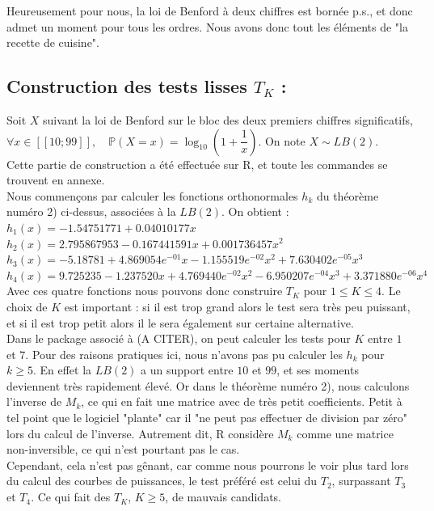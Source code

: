 \documentclass[12pt,a4paper]{article}
\begin{document}
Heureusement pour nous, la loi de Benford à deux chiffres est bornée p.s., et donc admet un moment pour tous les ordres. Nous avons donc tout les éléments de "la recette de cuisine".


\subsection{Construction des tests lisses $T_{K}$ : \\}


Soit $X$ suivant la loi de Benford sur le bloc des deux premiers chiffres significatifs, $\forall x \in [\![ 10; 99 ]\!], \quad \mathbb{P}(X=x) = \log_{10} \left( 1 + \dfrac{1}{x} \right)$. On note $X \sim LB(2)$. \\

Cette partie de construction a été effectuée sur R, et toute les commandes se trouvent en annexe. \\

Nous commençons par calculer les fonctions orthonormales $h_{k}$ du théorème numéro 2) ci-dessus, associées à la $LB(2)$. On obtient : \\

$h_{1}(x) = -1.54751771 + 0.04010177 x$ \\

$h_{2}(x) = 2.795867953 - 0.167441591 x + 0.001736457 x^2$ \\

$h_{3}(x) = -5.18781 + 4.869054e^{-01} x - 1.155519e^{-02} x^2 + 7.630402e^{-05} x^3$ \\

$h_{4}(x) = 9.725235 - 1.237520 x + 4.769440e^{-02} x^2 - 6.950207e^{-04} x^3 + 3.371880e^{-06} x^4$ \\

Avec ces quatre fonctions nous pouvons donc construire $T_{K}$ pour $1 \leq K \leq 4$. Le choix de $K$ est important : si il est trop grand alors le test sera très peu puissant, et si il est trop petit alors il le sera également sur certaine alternative. \\
Dans le package associé à (A CITER), on peut calculer les tests pour $K$ entre $1$ et $7$. Pour des raisons pratiques ici, nous n'avons pas pu calculer les $h_{k}$ pour $k \geq 5$. En effet la $LB(2)$ a un support entre $10$ et $99$, et ses moments deviennent très rapidement élevé. Or dans le théorème numéro 2), nous calculons l'inverse de $M_{k}$, ce qui en fait une matrice avec de très petit coefficients. Petit à tel point que le logiciel "plante" car il "ne peut pas effectuer de division par zéro" lors du calcul de l'inverse. Autrement dit, R considère $M_{k}$ comme une matrice non-inversible, ce qui n'est pourtant pas le cas. \\
Cependant, cela n'est pas gênant, car comme nous pourrons le voir plus tard lors du calcul des courbes de puissances, le test préféré est celui du $T_{2}$, surpassant $T_{3}$ et $T_{4}$. Ce qui fait des $T_{K}$, $K \geq 5$, de mauvais candidats. \\
\end{document}

